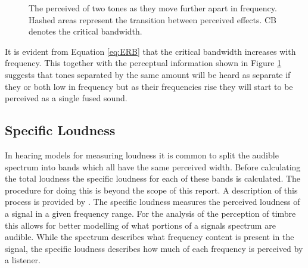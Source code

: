 		\begin{figure}[h!]
			\centering
			\caption{The perceived of two tones as they move further apart in frequency. Hashed areas represent
				 the transition between perceived effects. CB denotes the critical bandwidth.}
			\label{fig:ToneSeparation}
		\end{figure}

		It is evident from Equation \ref{eq:ERB} that the critical bandwidth increases with frequency. This together
		with the perceptual information shown in Figure \ref{fig:ToneSeparation} suggests that tones separated by
		the same amount will be heard as separate if they or both low in frequency but as their frequencies rise
		they will start to be perceived as a single fused sound.

	\subsection{Specific Loudness}
	\label{sec:Timbre-PsychoacousticPrinciples-SpecificLoudness}
		In hearing models for measuring loudness it is common to split the audible spectrum into bands which all
		have the same perceived width. Before calculating the total loudness the specific loudness for each of these
		bands is calculated. The procedure for doing this is beyond the scope of this report. A description of this
		process is provided by \citet{moore1997a}. The specific loudness measures the perceived loudness of a signal
		in a given frequency range. For the analysis of the perception of timbre this allows for better modelling of
		what portions of a signals spectrum are audible. While the spectrum describes what frequency content is
		present in the signal, the specific loudness describes how much of each frequency is perceived by a
		listener.


